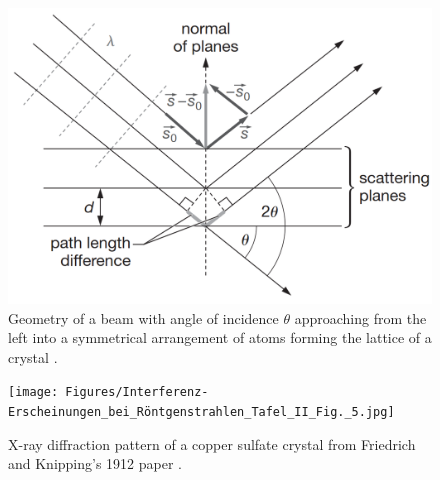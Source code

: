 \documentclass[aps,prb,twocolumn,superscriptaddress]{revtex4-2}
\begin{document}
\begin{figure}[!h]
    \centering
    \includegraphics[width=0.9\linewidth]{Figures/Bragg_diffraction_2.svg.png}
    \caption{Geometry of a beam with angle of incidence $\theta$ approaching from the left
    into a symmetrical arrangement of atoms forming the lattice of a crystal \cite{Girolami}. }
    \label{fig:Bragg}
\end{figure}

\begin{figure}[h]
    \centering
    \texttt{[image: Figures/Interferenz-Erscheinungen\_bei\_Röntgenstrahlen\_Tafel\_II\_Fig.\_5.jpg]}
    \caption{X-ray diffraction pattern of a copper sulfate crystal from
    Friedrich and Knipping's 1912 paper \cite{vonLaue1912}.} \label{fig:Laue}
\end{figure}
\end{document}
